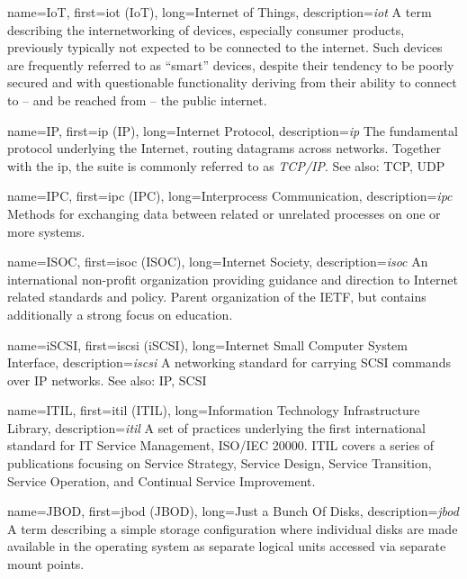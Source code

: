 {
	name={IoT},
	first={\acrlong{iot} (IoT)},
	long={Internet of Things},
	description={{\em \acrlong{iot}}
A term describing the internetworking of devices,
especially consumer products, previously typically not
expected to be connected to the internet.  Such
devices are frequently referred to as ``smart''
devices, despite their tendency to be poorly secured
and with questionable functionality deriving from
their ability to connect to -- and be reached from --
the public internet.}
}

{
	name={IP},
	first={\acrlong{ip} (IP)},
	long={Internet Protocol},
	description={{\em \acrlong{ip}} The fundamental protocol underlying the
Internet, routing datagrams across networks.  Together
with the \acrlong{ip}, the suite is commonly referred
to as {\em TCP/IP}. See also: TCP, UDP}
}

{
	name={IPC},
	first={\acrlong{ipc} (IPC)},
	long={Interprocess Communication},
	description={{\em \acrlong{ipc}} Methods for exchanging data
between related or unrelated processes on one or more
systems.}
}

{
	name={ISOC},
	first={\acrlong{isoc} (ISOC)},
	long={Internet Society},
	description={{\em \acrlong{isoc}} An international non-profit
organization providing guidance and direction to Internet related
standards and policy.  Parent organization of the IETF, but contains
additionally a strong focus on education.}
}

{
	name={iSCSI},
	first={\acrlong{iscsi} (iSCSI)},
	long={Internet Small Computer System Interface},
	description={{\em \acrlong{iscsi}} A networking
standard for carrying SCSI commands over IP networks.
See also: IP, SCSI}
}

{
	name={ITIL},
	first={\acrlong{itil} (ITIL)},
	long={Information Technology Infrastructure Library},
	description={{\em \acrlong{itil}} A set of
practices underlying the first international standard for IT Service
Management, ISO/IEC 20000.  ITIL covers a series of publications focusing
on Service Strategy, Service Design, Service Transition, Service
Operation, and Continual Service Improvement.}
}

{
	name={JBOD},
	first={\acrlong{jbod} (JBOD)},
	long={Just a Bunch Of Disks},
	description={{\em \acrlong{jbod}} A term describing a simple storage
configuration where individual disks are made available in the operating
system as separate logical units accessed via separate
mount points.}
}

